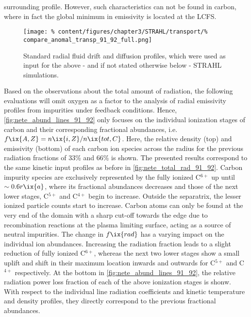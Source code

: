 surrounding profile. However, such characteristics can not be found in carbon, where in fact the global minimum in emissivity is located at the LCFS.\\%
%
            \begin{figure}[t]%
                \centering%
                \captionsetup{width=.47\textwidth}%
                \begin{minipage}[b]{0.48\textwidth}%
                    \centering%
                    \texttt{[image: \%
                            content/figures/chapter3/STRAHL/transport/\%
                            compare\_anomal\_transp\_91\_92\_full.png]}
                \end{minipage}%
                \hfill%
                \begin{minipage}[b]{0.48\textwidth}%
                    \centering%
                    \caption{Standard radial fluid drift and diffusion profiles, which were used as input for the above - and if not stated otherwise below - STRAHL simulations.}\label{fig:fluid_coeffs}%
                \end{minipage}%
            \end{figure}%
%
            Based on the observations about the total amount of radiation, the following evaluations will omit oxygen as a factor to the analysis of radial emissivity profiles from impurities under feedback conditions. Hence, \cref{fig:nete_abund_lines_91_92} only focuses on the individual ionization stages of carbon and their corresponding fractional abundances, i.e. $f\ix{A,Z}=n\ix{i,Z}/n\ix{tot,C}$. Here, the relative density (top) and emissivity (bottom) of each carbon ion species across the radius for the previous radiation fractions of 33\% and 66\% is shown. The presented results correspond to the same kinetic input profiles as before in \cref{fig:nete_total_rad_91_92}. Carbon impurity species are exclusively represented by the fully ionized C$^{6+}$ up until $\sim0.6r\ix{a}$, where its fractional abundances decreases and those of the next lower stages, C$^{5+}$ and C$^{4+}$ begin to increase. Outside the separatrix, the lesser ionized particle counts start to increase. Carbon atoms can only be found at the very end of the domain with a sharp cut-off towards the edge due to recombination reactions at the plasma limiting surface, acting as a source of neutral impurities. The change in $f\ix{rad}$ has a varying impact on the individual ion abundances. Increasing the radiation fraction leads to a slight reduction of fully ionized C$^{6+}$, whereas the next two lower stages show a small uplift and shift in their maximum location inwards and outwards for C$^{5+}$ and C$^{4+}$ respectively. At the bottom in \cref{fig:nete_abund_lines_91_92}, the relative radiation power loss fraction of each of the above ionization stages is shonw. With respect to the individual line radiation coefficients and kinetic temperature and density profiles, they directly correspond to the previous fractional abundances.\\%
